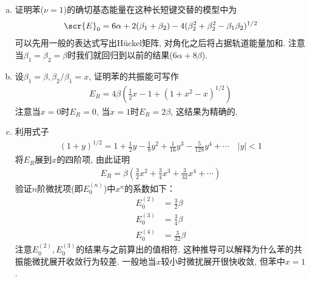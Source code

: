 {\begin{enumerate}[a.]
	\item 证明苯($\nu=1$)的确切基态能量在这种长短键交替的模型中为
	\begin{align*}
	\scr{E}_0 = 6\alpha + 2(\beta_1+\beta_2) - 4(\beta_2^2 + \beta_2^2 -\beta_1\beta_2)^{1/2}
	\end{align*}
	可以先用一般的表达式写出H\"uckel矩阵, 对角化之后将占据轨道能量加和. 注意当$\beta_1=\beta_2=\beta$时我们就回归到以前的结果($6\alpha+8\beta$). 
	\item 设$\beta_1=\beta,\beta_2/\beta_1=x$, 证明苯的共振能可写作
	\begin{align*}
	E_R = 4\beta(\tfrac{1}{2}x-1+(1+x^2-x)^{1/2})
	\end{align*}
	注意当$x=0$时$E_R=0$, 当$x=1$时$E_R=2\beta$, 这结果为精确的.
	\item
	利用式子
	\begin{align*}
	(1+y)^{1/2} = 1 + \tfrac{1}{2}y -\tfrac{1}{8}y^2 + \tfrac{1}{16}y^3 - \tfrac{5}{128}y^4 + \cdots\quad|y|<1
 	\end{align*}
 	将$E_R$展到$x$的四阶项, 由此证明
 	\begin{align*}
 	E_R = \beta(\tfrac{3}{2}x^2+\tfrac{3}{4}x^3 + \tfrac{3}{32}x^4+\cdots)
 	\end{align*}
 	验证$n$阶微扰项(即$E_0^{(n)}$)中$x^n$的系数如下：
 	\begin{align*}
 	E_0^{(2)} & = \tfrac{3}{2}\beta\\
 	E_0^{(3)} & = \tfrac{3}{4}\beta\\
 	E_0^{(4)} & = \tfrac{3}{32}\beta
 	\end{align*}
 	注意$E_0^{(2)},E_0^{(3)}$的结果与之前算出的值相符. 这种推导可以解释为什么苯的共振能微扰展开收敛行为较差. 一般地当$x$较小时微扰展开很快收敛, 但苯中$x=1$.
 	

\end{enumerate}}

